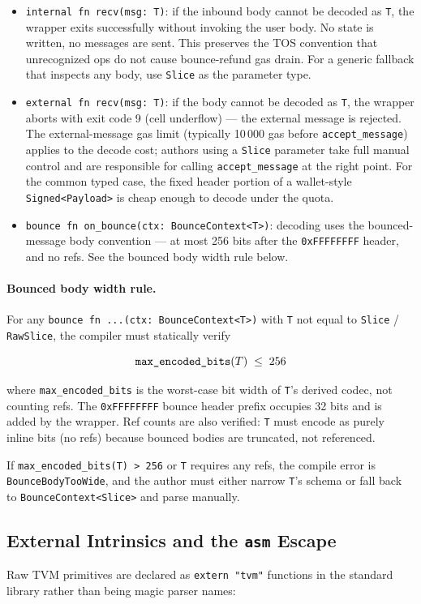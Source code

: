\documentclass[12pt,oneside]{article}
\begin{document}
\begin{itemize}
\item \verb|internal fn recv(msg: T)|: if the inbound body cannot be
decoded as \verb|T|, the wrapper exits successfully without invoking
the user body. No state is written, no messages are sent. This
preserves the TOS convention that unrecognized ops do not cause
bounce-refund gas drain. For a generic fallback that inspects any
body, use \verb|Slice| as the parameter type.
\item \verb|external fn recv(msg: T)|: if the body cannot be decoded as
\verb|T|, the wrapper aborts with exit code 9 (cell underflow) ---
the external message is rejected. The external-message gas limit
(typically 10\,000 gas before \verb|accept_message|) applies to the
decode cost; authors using a \verb|Slice| parameter take full manual
control and are responsible for calling \verb|accept_message| at the
right point. For the common typed case, the fixed header portion of a
wallet-style \verb|Signed<Payload>| is cheap enough to decode under
the quota.
\item \verb|bounce fn on_bounce(ctx: BounceContext<T>)|: decoding
uses the bounced-message body convention --- at most 256 bits after
the \verb|0xFFFFFFFF| header, and no refs. See the bounced body
width rule below.
\end{itemize}

\paragraph{Bounced body width rule.}
For any \verb|bounce fn ...(ctx: BounceContext<T>)| with \verb|T| not
equal to \verb|Slice| / \verb|RawSlice|, the compiler must statically
verify

\[
\verb|max_encoded_bits|(T) \;\le\; 256
\]

where \verb|max_encoded_bits| is the worst-case bit width of
\verb|T|'s derived codec, not counting refs. The \verb|0xFFFFFFFF|
bounce header prefix occupies 32 bits and is added by the wrapper.
Ref counts are also verified: \verb|T| must encode as purely inline
bits (no refs) because bounced bodies are truncated, not referenced.

If \verb|max_encoded_bits(T) > 256| or \verb|T| requires any refs, the
compile error is \verb|BounceBodyTooWide|, and the author must either
narrow \verb|T|'s schema or fall back to \verb|BounceContext<Slice>|
and parse manually.

\subsection{External Intrinsics and the \texttt{asm} Escape}
\label{sec:asm-escape}
Raw TVM primitives are declared as \verb|extern "tvm"| functions in
the standard library rather than being magic parser names:
\end{document}
